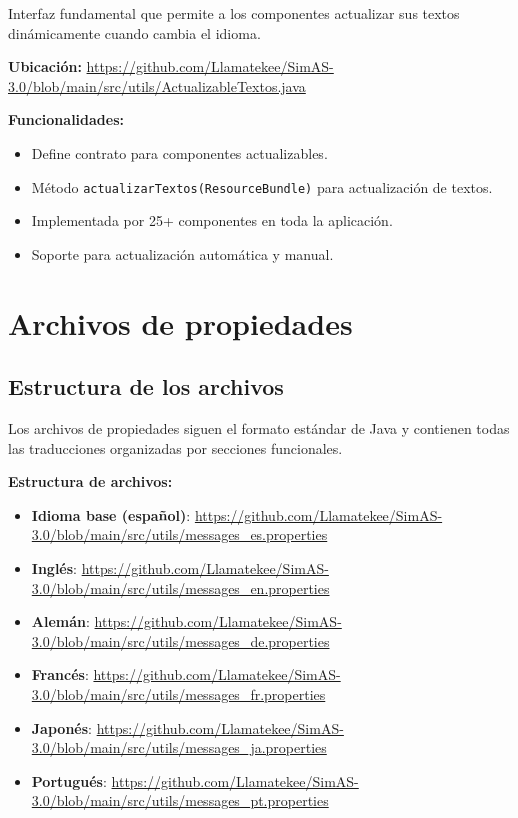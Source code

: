 Interfaz fundamental que permite a los componentes actualizar sus textos dinámicamente cuando cambia el idioma.

\textbf{Ubicación:} \url{https://github.com/Llamatekee/SimAS-3.0/blob/main/src/utils/ActualizableTextos.java}

\textbf{Funcionalidades:}
\begin{itemize}
    \item Define contrato para componentes actualizables.
    \item Método \texttt{actualizarTextos(ResourceBundle)} para actualización de textos.
    \item Implementada por 25+ componentes en toda la aplicación.
    \item Soporte para actualización automática y manual.
\end{itemize}

\section{Archivos de propiedades}

\subsection{Estructura de los archivos}

Los archivos de propiedades siguen el formato estándar de Java y contienen todas las traducciones organizadas por secciones funcionales.

\textbf{Estructura de archivos:}

\begin{itemize}
    \item \textbf{Idioma base (español)}: \url{https://github.com/Llamatekee/SimAS-3.0/blob/main/src/utils/messages_es.properties}
    \item \textbf{Inglés}: \url{https://github.com/Llamatekee/SimAS-3.0/blob/main/src/utils/messages_en.properties}
    \item \textbf{Alemán}: \url{https://github.com/Llamatekee/SimAS-3.0/blob/main/src/utils/messages_de.properties}
    \item \textbf{Francés}: \url{https://github.com/Llamatekee/SimAS-3.0/blob/main/src/utils/messages_fr.properties}
    \item \textbf{Japonés}: \url{https://github.com/Llamatekee/SimAS-3.0/blob/main/src/utils/messages_ja.properties}
    \item \textbf{Portugués}: \url{https://github.com/Llamatekee/SimAS-3.0/blob/main/src/utils/messages_pt.properties}
\end{itemize}

